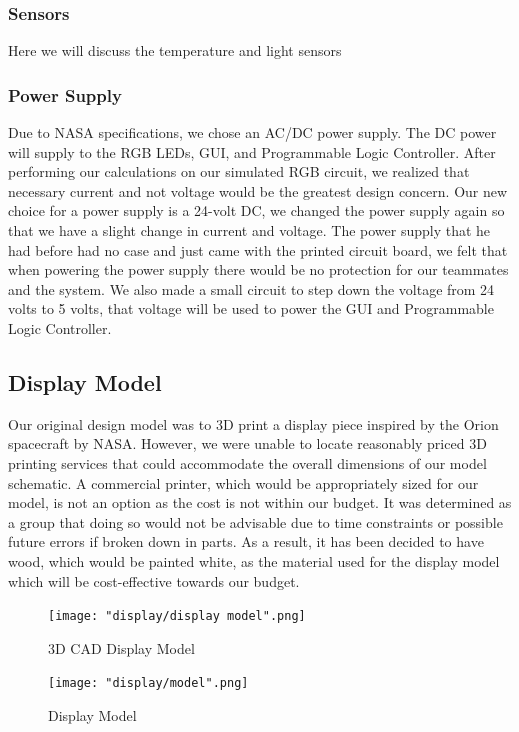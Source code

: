 \documentclass[12pt,a4paper]{report}
\begin{document}
\subsubsection{Sensors}
Here we will discuss the temperature and light sensors

\subsubsection{Power Supply}
Due to NASA specifications, we chose an AC/DC power supply. The DC power will supply to the RGB LEDs, GUI, and Programmable Logic Controller. After performing our calculations on our simulated RGB circuit, we realized that necessary current and not voltage would be the greatest design concern. Our new choice for a power supply is a 24-volt DC, we changed the power supply again so that we have a slight change in current and voltage. The power supply that he had before had no case and just came with the printed circuit board, we felt that when powering the power supply there would be no protection for our teammates and the system. We also made a small circuit to step down the voltage from 24 volts to 5 volts, that voltage will be used to power the GUI and Programmable Logic Controller. 

\subsection{Display Model}
Our original design model was to 3D print a display piece inspired by the Orion spacecraft by NASA. However, we were unable to locate reasonably priced 3D printing services that could accommodate the overall dimensions of our model schematic. A commercial printer, which would be appropriately sized for our model, is not an option as the cost is not within our budget. It was determined as a group that doing so would not be advisable due to time constraints or possible future errors if broken down in parts. As a result, it has been decided to have wood, which would be painted white, as the material used for the display model which will be cost-effective towards our budget.
\begin{figure}[H]
	\centering
	\texttt{[image: "display/display model".png]}\par			
	\vspace{0.1cm}
	\caption{3D CAD Display Model}
\end{figure}
\begin{figure}[H]
	\centering
	\texttt{[image: "display/model".png]}\par			
	\vspace{0.1cm}
	\caption{Display Model}
\end{figure}
\end{document}
